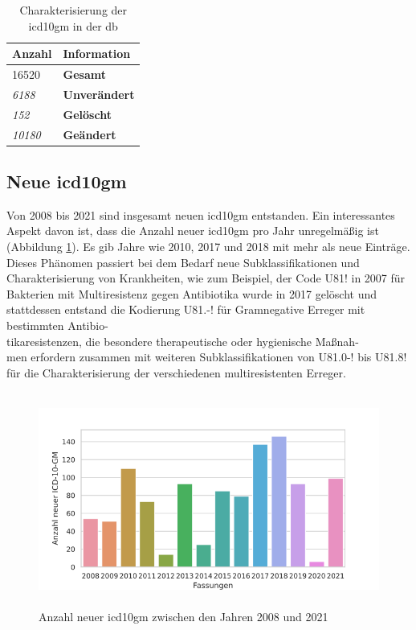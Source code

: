  \begin{table}[ht]
 	\centering
 	\small
 	\caption[\acs{icd10gm} in der \acs{db}]{Charakterisierung der \acs{icd10gm} in der \ac{db}}
 	\label{tab:icddb}
 	\begin{tabular}{|l|l|}
 		\hline
 		\rowcolor{lightgray}	Anzahl & Information \\ \hline 
 		16520 & \textbf{Gesamt} \\ \hline
 		\hline
 		\textit{6188} & \textbf{Unverändert} \\ \hline
 		\textit{152} & \textbf{Gelöscht} \\ \hline
 		\textit{10180} & \textbf{Geändert} \\ \hline
 	\end{tabular}
 \end{table}

\newpage

\subsection{Neue \acs{icd10gm}}

Von 2008 bis 2021 sind insgesamt {} neuen \ac{icd10gm} entstanden. Ein interessantes Aspekt davon ist, dass die Anzahl neuer \ac{icd10gm} pro Jahr unregelmäßig ist (Abbildung \ref{fig:newicdyear}). Es gib Jahre wie 2010, 2017 und 2018 mit mehr als {} neue Einträge. Dieses Phänomen passiert bei dem Bedarf neue Subklassifikationen und Charakterisierung von Krankheiten, wie zum Beispiel, der Code {\ttfamily U81!} in 2007 für {\ttfamily Bakterien mit Multiresistenz gegen Antibiotika} wurde in 2017 gelöscht und stattdessen entstand die Kodierung {\ttfamily U81.-!} für {\ttfamily Gramnegative Erreger mit bestimmten Antibio-\\tikaresistenzen, die besondere therapeutische oder hygienische Maßnah-\\men erfordern} zusammen mit {} weiteren Subklassifikationen von {\ttfamily U81.0-!} bis {\ttfamily U81.8!} für die Charakterisierung der verschiedenen multiresistenten Erreger.

\begin{figure}[ht]
	\centering
	\includegraphics[height=7cm]{figures/newicdyear}
	\caption[Neue \acs{icd10gm} pro Jahr]{Anzahl neuer \acs{icd10gm} zwischen den Jahren 2008 und 2021}
	\label{fig:newicdyear}
\end{figure} 

